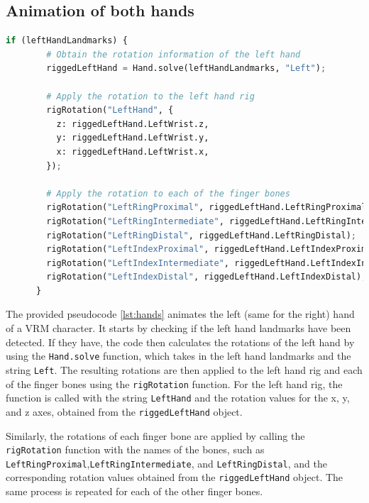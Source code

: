\subsection{Animation of both hands}
\begin{lstlisting}[language=Python,caption=Animating the left hand,label=lst:hands]
    if (leftHandLandmarks) {
        # Obtain the rotation information of the left hand
        riggedLeftHand = Hand.solve(leftHandLandmarks, "Left");
      
        # Apply the rotation to the left hand rig
        rigRotation("LeftHand", {
          z: riggedLeftHand.LeftWrist.z,
          y: riggedLeftHand.LeftWrist.y,
          x: riggedLeftHand.LeftWrist.x,
        });
      
        # Apply the rotation to each of the finger bones
        rigRotation("LeftRingProximal", riggedLeftHand.LeftRingProximal);
        rigRotation("LeftRingIntermediate", riggedLeftHand.LeftRingIntermediate);
        rigRotation("LeftRingDistal", riggedLeftHand.LeftRingDistal);
        rigRotation("LeftIndexProximal", riggedLeftHand.LeftIndexProximal);
        rigRotation("LeftIndexIntermediate", riggedLeftHand.LeftIndexIntermediate);
        rigRotation("LeftIndexDistal", riggedLeftHand.LeftIndexDistal);
      }
\end{lstlisting}
The provided pseudocode \ref{lst:hands} animates the left (same for the right) hand of a VRM character. 
It starts by checking if the left hand landmarks have been detected. 
If they have, the code then calculates the rotations of the left hand by 
using the \texttt{Hand.solve} function, which takes in the left hand landmarks and the string \texttt{Left}.
The resulting rotations are then applied to the left hand rig and each of the finger 
bones using the \texttt{rigRotation} function. For the left hand rig, the function is called with 
the string \texttt{LeftHand} and the rotation values for the x, y, and z axes, obtained from the 
\texttt{riggedLeftHand} object.

Similarly, the rotations of each finger bone are applied by calling the \texttt{rigRotation} function 
with the names of the bones, such as \texttt{LeftRingProximal},\texttt{LeftRingIntermediate}, and \texttt{LeftRingDistal}, 
and the corresponding rotation values obtained from the \texttt{riggedLeftHand} object. The same process is 
repeated for each of the other finger bones.